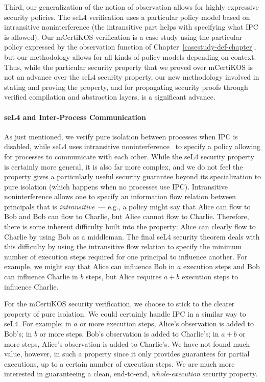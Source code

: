 Third, our generalization of the notion of observation allows
  for highly expressive security policies. The seL4 verification
  uses a particular policy model based on intransitive noninterference
  (the intransitive part helps with specifying what IPC is
  allowed). Our mCertiKOS verification is a case study using the
  particular policy expressed by the observation function of
  Chapter~\ref{casestudy-def-chapter}, but our methodology allows for
  all kinds of policy models depending on context. Thus, while the
  particular security property that we proved over mCertiKOS is not an
  advance over the seL4 security property, our new methodology
  involved in stating and proving the property, and for propagating
  security proofs through verified compilation and abstraction layers, is
  a significant advance.

\paragraph{seL4 and Inter-Process Communication}
As just mentioned, we verify pure isolation between processes when
IPC is disabled, while seL4 uses intransitive noninterference~\cite{rushby92}
to specify a policy allowing for processes to communicate with each 
other. While the seL4 security property is certainly more general, it 
is also far more complex, and we do not feel the property gives a
particularly useful security guarantee beyond its specialization to 
pure isolation (which happens when no processes use IPC). Intransitive
noninterference allows one to specify an information flow relation
between principals that is \emph{intransitive}~--- e.g., a policy
might say that Alice can flow to Bob and Bob can flow to Charlie,
but Alice cannot flow to Charlie. Therefore, there is some inherent 
difficulty built into the property: Alice can clearly flow to Charlie
by using Bob as a middleman. The final seL4 security theorem deals with
this difficulty by using the intransitive flow relation to specify the 
minimum number of execution steps required for one principal to 
influence another. For example, we might say that Alice can influence 
Bob in $a$ execution steps and Bob can influence Charlie in $b$ steps, 
but Alice requires $a+b$ execution steps to influence Charlie.

For the mCertiKOS security verification, we choose to stick to the
clearer property of pure isolation. We could certainly handle IPC
in a similar way to seL4. For example: in $a$ or more execution 
steps, Alice's observation is added to Bob's; in $b$ or more steps, 
Bob's observation is added to Charlie's; in $a+b$ or more steps,
Alice's observation is added to Charlie's. We have not found much
value, however, in such a property since it only provides guarantees
for partial executions, up to a certain number of execution steps.
We are much more interested in guaranteeing a clean, end-to-end,
\emph{whole-execution} security property.

